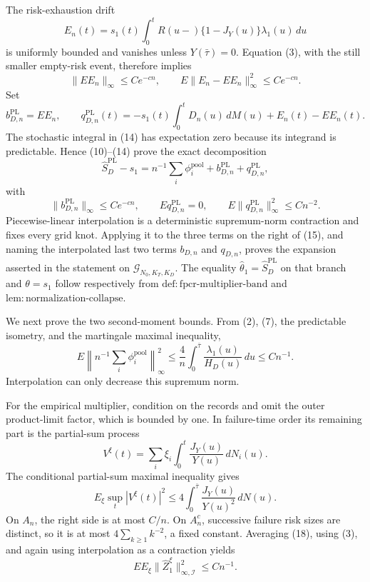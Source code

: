 The risk-exhaustion drift
\[
 E_n(t)=s_1(t)\int_0^tR(u-)\{1-J_Y(u)\}\lambda_1(u)\,du
\]
is uniformly bounded and vanishes unless \(Y(\bar\tau)=0\).  Equation (3), with the still smaller empty-risk event, therefore implies
\[
 \|E E_n\|_\infty\le Ce^{-cn},
 \qquad
 E\|E_n-E E_n\|_\infty^2\le Ce^{-cn}.                 \tag{13}
\]
Set
\[
 b_{D,n}^{\mathrm{PL}}=E E_n,
 \qquad
 q_{D,n}^{\mathrm{PL}}(t)
 =-s_1(t)\int_0^tD_n(u)\,dM(u)+E_n(t)-E E_n(t).        \tag{14}
\]
The stochastic integral in (14) has expectation zero because its integrand is predictable.  Hence (10)--(14) prove the exact decomposition
\[
 \widehat S_D^{\mathrm{PL}}-s_1
 =n^{-1}\sum_i\phi_i^{\mathrm{pool}}
  +b_{D,n}^{\mathrm{PL}}+q_{D,n}^{\mathrm{PL}},         \tag{15}
\]
with
\[
 \|b_{D,n}^{\mathrm{PL}}\|_\infty\le Ce^{-cn},
 \qquad E q_{D,n}^{\mathrm{PL}}=0,
 \qquad E\|q_{D,n}^{\mathrm{PL}}\|_\infty^2\le Cn^{-2}. \tag{16}
\]
Piecewise-linear interpolation is a deterministic supremum-norm contraction and fixes every grid knot.  Applying it to the three terms on the right of (15), and naming the interpolated last two terms \(b_{D,n}\) and \(q_{D,n}\), proves the expansion asserted in the statement on \(\mathcal G_{N_0,K_T,K_D}\).  The equality \(\widehat\theta_1=\widehat S_D^{\mathrm{PL}}\) on that branch and \(\theta=s_1\) follow respectively from \(\mathrm{def:fpcr\mbox{-}multiplier\mbox{-}band}\) and \(\mathrm{lem:normalization\mbox{-}collapse}\).

We next prove the two second-moment bounds.  From (2), (7), the predictable isometry, and the martingale maximal inequality,
\[
 E\left\|n^{-1}\sum_i\phi_i^{\mathrm{pool}}\right\|_\infty^2
 \le \frac4n\int_0^{\bar\tau}
       \frac{\lambda_1(u)}{H_D(u)}\,du
 \le Cn^{-1}.                                          \tag{17}
\]
Interpolation can only decrease this supremum norm.

For the empirical multiplier, condition on the records and omit the outer product-limit factor, which is bounded by one.  In failure-time order its remaining part is the partial-sum process
\[
 V^\xi(t)=\sum_i\xi_i\int_0^t\frac{J_Y(u)}{Y(u)}\,dN_i(u).
\]
The conditional partial-sum maximal inequality gives
\[
 E_\xi\sup_t|V^\xi(t)|^2
 \le4\int_0^{\bar\tau}\frac{J_Y(u)}{Y(u)^2}\,dN(u).   \tag{18}
\]
On \(A_n\), the right side is at most \(C/n\).  On \(A_n^c\), successive failure risk sizes are distinct, so it is at most
\(4\sum_{k\ge1}k^{-2}\), a fixed constant.  Averaging (18), using (3), and again using interpolation as a contraction yields
\[
 E E_\xi\|\widehat Z_1^\xi\|_{\infty,\mathcal I}^2
 \le Cn^{-1}.                                          \tag{19}
\]

